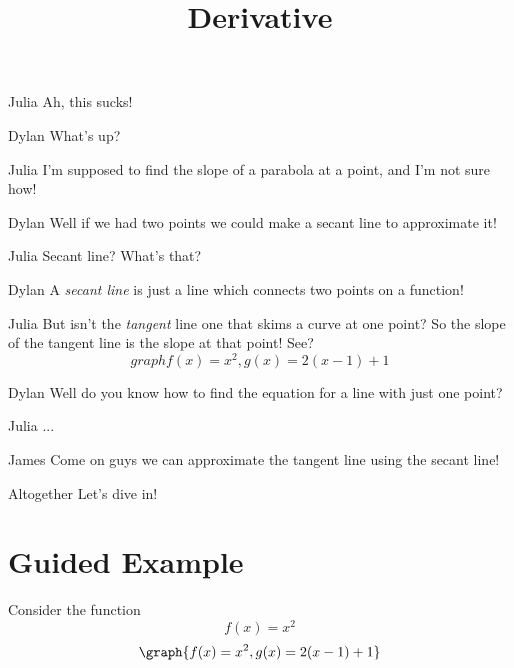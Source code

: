 \documentclass{ximera}
\title{Derivative}
\begin{document}
\maketitle
\begin{dialogue}
\item[Julia] Ah, this sucks!
\item[Dylan] What's up?
\item[Julia] I'm supposed to find the slope of a parabola at a point, and I'm not sure how!
\item[Dylan] Well if we had two points we could make a secant line to approximate it!
\item[Julia] Secant line? What's that?
\item[Dylan] A \textit{secant line} is just a line which connects two points on a function!
\item[Julia] But isn't the \textit{tangent} line one that skims a curve at one point? So the slope of the tangent line is the slope at that point! See?
\[
graph{f(x)=x^2,g(x)=2(x-1)+1}
\]
\item[Dylan] Well do you know how to find the equation for a line with just one point?
\item[Julia]...
\item[James] Come on guys we can approximate the tangent line using the secant line!
\item[Altogether]Let's dive in!
\end{dialogue}



\section{Guided Example}

Consider the function $$f(x) = x^2$$
\[
\graph{f(x)=x^2,g(x)=2(x-1)+1}
\]
\end{document}
